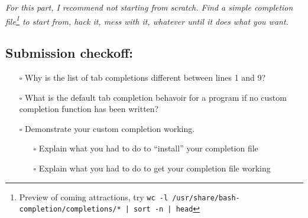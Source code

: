 \documentclass{article}
\begin{document}
\medskip
\noindent
\emph{%
  For this part, I recommend not starting from scratch. Find a simple
  completion file\footnote{
    Preview of coming attractions, try
    \texttt{wc -l /usr/share/bash-completion/completions/* | sort -n | head}
  }
  to start from, hack it, mess with it, whatever until it does what you want.
}

\subsection*{Submission checkoff:}
\begin{itemize}
  \item[$\square$] Why is the list of tab completions different between lines
    1 and 9?
  \item[$\square$] What is the default tab completion behavoir for a program
    if no custom completion function has been written?
  \item[$\square$] Demonstrate your custom completion working.
    \begin{itemize}
      \item[$\square$] Explain what you had to do to ``install'' your
        completion file
      \item[$\square$] Explain what you had to do to get your completion file
        working
    \end{itemize}
\end{itemize}
\end{document}
